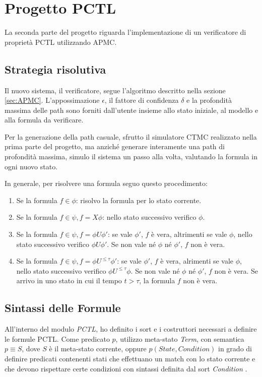 \section{Progetto PCTL}

La seconda parte del progetto riguarda l'implementazione di un verificatore di
proprietà PCTL utilizzando APMC.

\subsection{Strategia risolutiva}
\label{sec:strategia}
Il nuovo sistema, il verificatore, segue l'algoritmo descritto
nella sezione \ref{sec:APMC}. L'appossimazione $\epsilon$, il fattore di
confidenza $\delta$ e la profondità massima delle path sono forniti dall'utente
insieme allo stato iniziale, al modello e alla formula da verificare. 

Per la generazione della path casuale, sfrutto il simulatore CTMC
realizzato nella prima parte del progetto, ma anziché generare interamente una
path di profondità massima, simulo il sistema un passo alla volta, valutando la
formula in ogni nuovo stato.

In generale, per risolvere una formula seguo questo procedimento:
\begin{enumerate}
  \item Se la formula $f \in \phi$: risolvo la formula per lo
  stato corrente.
  \item Se la formula $f \in \psi , f = X \phi$: nello stato successivo
  verifico $\phi$.
  \item Se la formula $f \in \psi , f = \phi U \phi'$: se vale $\phi'$, $f$ è
  vera, altrimenti se vale $\phi$, nello stato successivo verifico $\phi U
  \phi'$. Se non vale né $\phi$ né $\phi'$, $f$ non è vera.
  \item Se la formula $f \in \psi , f = \phi U^{\leq\tau} \phi'$: se vale
  $\phi'$, $f$ è vera, alrimenti se vale $\phi$, nello stato successivo verifico
  $\phi U^{\leq\tau} \phi$. Se non vale né $\phi$ né $\phi'$, $f$ non è vera. Se
  arrivo in uno stato in cui il tempo $t > \tau$, la formula $f$ non è vera.
\end{enumerate}


\subsection{Sintassi delle Formule}
All'interno del modulo \emph{PCTL}, ho definito i sort e i costruttori necessari
a definire le formule PCTL. Come predicato $p$, utilizzo meta-stato \emph{Term},
con semantica $p \equiv S$, dove $S$ è il meta-stato corrente, oppure
$p(State, Condition)$ in grado di definire predicati contenenti stati che
effettuano un match con lo stato corrente e che devono rispettare certe
condizioni con sintassi definita dal sort \emph{Condition} \cite{maudemanual}.

